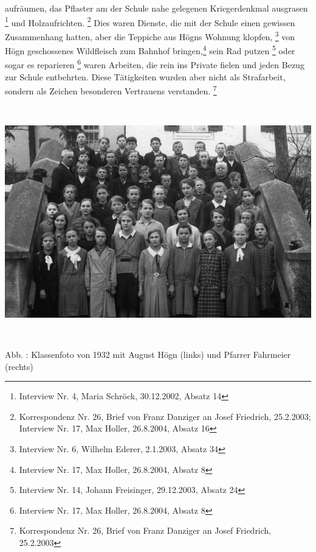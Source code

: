 \documentclass[a4paper]{article}
\newcounter{Abb}
\renewcommand\theAbb{\arabic{Abb}}
\begin{document}
aufräumen, das Pflaster am der Schule nahe gelegenen Kriegerdenkmal
ausgrasen \footnote{Interview Nr. 4, Maria Schröck, 30.12.2002, Absatz
14} und Holzaufrichten. \footnote{Korrespondenz Nr. 26, Brief von Franz
Danziger an Josef Friedrich, 25.2.2003; Interview Nr. 17, Max Holler,
26.8.2004, Absatz 16} Dies waren Dienste, die mit der Schule einen
gewissen Zusammenhang hatten, aber die Teppiche aus Högns Wohnung
klopfen, \footnote{Interview Nr. 6, Wilhelm Ederer, 2.1.2003, Absatz
34} von Högn geschossenes Wildfleisch zum Bahnhof bringen,\footnote{
Interview Nr. 17, Max Holler, 26.8.2004, Absatz 8} sein Rad
putzen \footnote{Interview Nr. 14, Johann Freisinger, 29.12.2003,
Absatz 24} oder sogar es reparieren \footnote{Interview Nr. 17, Max
Holler, 26.8.2004, Absatz 8} waren Arbeiten, die rein ins Private
fielen und jeden Bezug zur Schule entbehrten. Diese Tätigkeiten wurden
aber nicht als Strafarbeit, sondern als Zeichen besonderen Vertrauens
verstanden. \footnote{Korrespondenz Nr. 26, Brief von Franz Danziger an
Josef Friedrich, 25.2.2003}

{%
\includegraphics[width=16.044cm,height=10.081cm]{pictures/zulassungsarbeit-img031.jpg}
 \par}
Abb. \stepcounter{Abb}{\theAbb}: Klassenfoto von 1932 mit August Högn
(links) und Pfarrer Fahrmeier (rechts)
\end{document}
